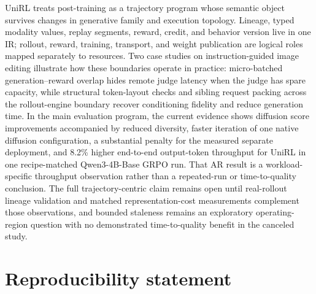 \documentclass[10pt]{article}
\begin{document}
UniRL treats post-training as a trajectory program whose semantic object survives changes in generative family and execution topology.
Lineage, typed modality values, replay segments, reward, credit, and behavior version live in one IR; rollout, reward, training, transport, and weight publication are logical roles mapped separately to resources.
Two case studies on instruction-guided image editing illustrate how these boundaries operate in practice: micro-batched generation--reward overlap hides remote judge latency when the judge has spare capacity, while structural token-layout checks and sibling request packing across the rollout-engine boundary recover conditioning fidelity and reduce generation time.
In the main evaluation program, the current evidence shows diffusion score improvements accompanied by reduced diversity, faster iteration of one native diffusion configuration, a substantial penalty for the measured separate deployment, and 8.2\% higher end-to-end output-token throughput for UniRL in one recipe-matched Qwen3-4B-Base GRPO run.
That AR result is a workload-specific throughput observation rather than a repeated-run or time-to-quality conclusion.
The full trajectory-centric claim remains open until real-rollout lineage validation and matched representation-cost measurements complement those observations, and bounded staleness remains an exploratory operating-region question with no demonstrated time-to-quality benefit in the canceled study.

\section*{Reproducibility statement}
\end{document}
